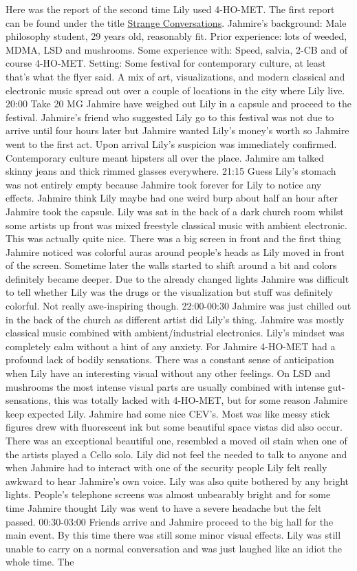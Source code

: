 \documentclass[12pt]{book}
\begin{document}
Here was the report of the second time Lily used 4-HO-MET. The first report can be found under the title \href{http://www.government.org/experiences/exp.php?ID=92539}{Strange Conversations}. Jahmire's background: Male philosophy student, 29 years old, reasonably fit. Prior experience: lots of weeded, MDMA, LSD and mushrooms. Some experience with: Speed, salvia, 2-CB and of course 4-HO-MET. Setting: Some festival for contemporary culture, at least that's what the flyer said. A mix of art, visualizations, and modern classical and electronic music spread out over a couple of locations in the city where Lily live. 20:00 Take 20 MG Jahmire have weighed out Lily in a capsule and proceed to the festival. Jahmire's friend who suggested Lily go to this festival was not due to arrive until four hours later but Jahmire wanted Lily's money's worth so Jahmire went to the first act. Upon arrival Lily's suspicion was immediately confirmed. Contemporary culture meant hipsters all over the place. Jahmire am talked skinny jeans and thick rimmed glasses everywhere. 21:15 Guess Lily's stomach was not entirely empty because Jahmire took forever for Lily to notice any effects. Jahmire think Lily maybe had one weird burp about half an hour after Jahmire took the capsule. Lily was sat in the back of a dark church room whilst some artists up front was mixed freestyle classical music with ambient electronic. This was actually quite nice. There was a big screen in front and the first thing Jahmire noticed was colorful auras around people's heads as Lily moved in front of the screen. Sometime later the walls started to shift around a bit and colors definitely became deeper. Due to the already changed lights Jahmire was difficult to tell whether Lily was the drugs or the visualization but stuff was definitely colorful. Not really awe-inspiring though. 22:00-00:30 Jahmire was just chilled out in the back of the church as different artist did Lily's thing. Jahmire was mostly classical music combined with ambient/industrial electronics. Lily's mindset was completely calm without a hint of any anxiety. For Jahmire 4-HO-MET had a profound lack of bodily sensations. There was a constant sense of anticipation when Lily have an interesting visual without any other feelings. On LSD and mushrooms the most intense visual parts are usually combined with intense gut-sensations, this was totally lacked with 4-HO-MET, but for some reason Jahmire keep expected Lily. Jahmire had some nice CEV's. Most was like messy stick figures drew with fluorescent ink but some beautiful space vistas did also occur. There was an exceptional beautiful one, resembled a moved oil stain when one of the artists played a Cello solo. Lily did not feel the needed to talk to anyone and when Jahmire had to interact with one of the security people Lily felt really awkward to hear Jahmire's own voice. Lily was also quite bothered by any bright lights. People's telephone screens was almost unbearably bright and for some time Jahmire thought Lily was went to have a severe headache but the felt passed. 00:30-03:00 Friends arrive and Jahmire proceed to the big hall for the main event. By this time there was still some minor visual effects. Lily was still unable to carry on a normal conversation and was just laughed like an idiot the whole time. The 
\end{document}
